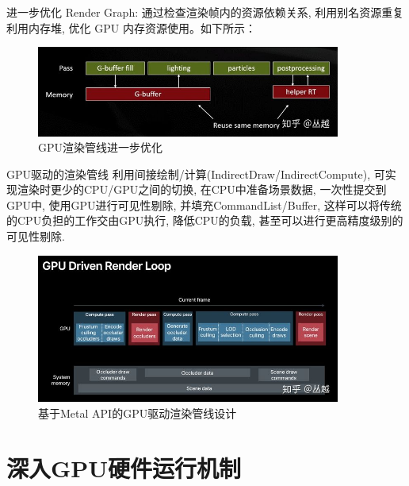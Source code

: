 \documentclass[UTF8]{ctexart}
\begin{document}
进一步优化 Render Graph:
通过检查渲染帧内的资源依赖关系, 利用别名资源重复利用内存堆, 优化 GPU 内存资源使用。如下所示：

\begin{figure}[H]
  \includegraphics[width=10cm]{rendering_pipeline_design_opt.jpg}
  \centering
  \caption{GPU渲染管线进一步优化}
  \label{fig:gpu_rendering_pipeline_optimization}
\end{figure}

GPU驱动的渲染管线
利用间接绘制/计算(IndirectDraw/IndirectCompute), 可实现渲染时更少的CPU/GPU之间的切换, 在CPU中准备场景数据, 一次性提交到GPU中, 使用GPU进行可见性剔除, 并填充CommandList/Buffer, 这样可以将传统的CPU负担的工作交由GPU执行, 降低CPU的负载, 甚至可以进行更高精度级别的可见性剔除.
\begin{figure}[H]
  \includegraphics[width=10cm]{gpu_driven_rendering.jpg}
  \centering
  \caption{基于Metal API的GPU驱动渲染管线设计}
  \label{fig:gpu_rendering_pipeline_optimization}
\end{figure}

\section{深入GPU硬件运行机制\cite{deepIntoGPU}}
\end{document}
